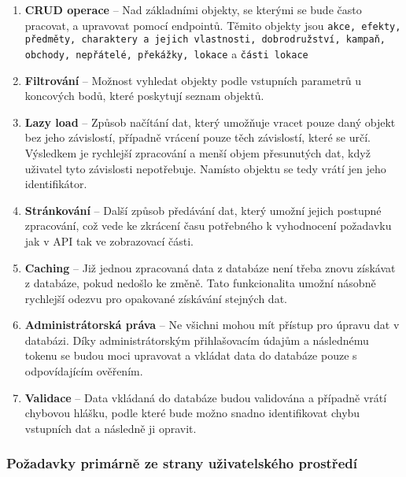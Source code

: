 \begin{enumerate}[label=\textbf{F\arabic*}:, leftmargin=*, align=left]
    \item \textbf{CRUD operace} -- Nad základními objekty, se kterými se bude často pracovat, a upravovat pomocí endpointů. Těmito objekty jsou \texttt{akce, efekty, předměty, charaktery a jejich vlastnosti, dobrodružství, kampaň, obchody, nepřátelé, překážky, lokace} a \texttt{části lokace}
    \item \textbf{Filtrování} -- Možnost vyhledat objekty podle vstupních parametrů u koncových bodů, které poskytují seznam objektů.
    \item \textbf{Lazy load} -- Způsob načítání dat, který umožňuje vracet pouze daný objekt bez jeho závislostí, případně vrácení pouze těch závislostí, které se určí. Výsledkem je rychlejší zpracování a menší objem přesunutých dat, když uživatel tyto závislosti nepotřebuje. Namísto objektu se tedy vrátí jen jeho identifikátor.
    \item \textbf{Stránkování} -- Další způsob předávání dat, který umožní jejich postupné zpracování, což vede ke zkrácení času potřebného k vyhodnocení požadavku jak v API tak ve zobrazovací části.
    \item \textbf{Caching} -- Již jednou zpracovaná data z databáze není třeba znovu získávat z databáze, pokud nedošlo ke změně. Tato funkcionalita umožní násobně rychlejší odezvu pro opakované získávání stejných dat.
    \item \textbf{Administrátorská práva} -- Ne všichni mohou mít přístup pro úpravu dat v databázi. Díky administrátorským přihlašovacím údajům a následnému tokenu se budou moci upravovat a vkládat data do databáze pouze s odpovídajícím ověřením.
    \item \textbf{Validace} -- Data vkládaná do databáze budou validována a případně vrátí chybovou hlášku, podle které bude možno snadno identifikovat chybu vstupních dat a následně ji opravit.
\end{enumerate}


\subsubsection*{Požadavky primárně ze strany uživatelského prostředí}

